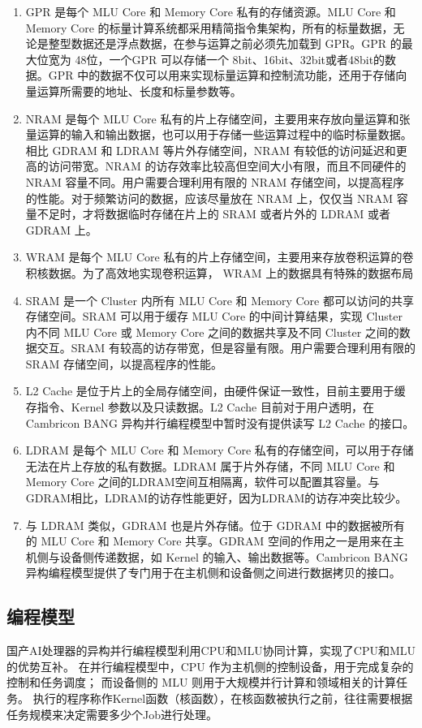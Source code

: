   \begin{enumerate}
  \item GPR 是每个 MLU Core 和 Memory Core 私有的存储资源。MLU Core 和 Memory Core 的标量计算系统都采用精简指令集架构，所有的标量数据，无论是整型数据还是浮点数据，在参与运算之前必须先加载到 GPR。GPR 的最大位宽为 48位，一个GPR 可以存储一个 8bit、16bit、32bit或者48bit的数据。GPR 中的数据不仅可以用来实现标量运算和控制流功能，还用于存储向量运算所需要的地址、长度和标量参数等。
  \item NRAM 是每个 MLU Core 私有的片上存储空间，主要用来存放向量运算和张量运算的输入和输出数据，也可以用于存储一些运算过程中的临时标量数据。相比 GDRAM 和 LDRAM 等片外存储空间，NRAM 有较低的访问延迟和更高的访问带宽。NRAM 的访存效率比较高但空间大小有限，而且不同硬件的 NRAM 容量不同。用户需要合理利用有限的 NRAM 存储空间，以提高程序的性能。对于频繁访问的数据，应该尽量放在 NRAM 上，仅仅当 NRAM 容量不足时，才将数据临时存储在片上的 SRAM 或者片外的 LDRAM 或者 GDRAM 上。
  \item WRAM 是每个 MLU Core 私有的片上存储空间，主要用来存放卷积运算的卷积核数据。为了高效地实现卷积运算，
  WRAM 上的数据具有特殊的数据布局
  \item SRAM 是一个 Cluster 内所有 MLU Core 和 Memory Core 都可以访问的共享存储空间。SRAM 可以用于缓存 MLU Core 的中间计算结果，实现 Cluster 内不同 MLU Core 或 Memory Core 之间的数据共享及不同 Cluster 之间的数据交互。SRAM 有较高的访存带宽，但是容量有限。用户需要合理利用有限的 SRAM 存储空间，以提高程序的性能。
  \item L2 Cache 是位于片上的全局存储空间，由硬件保证一致性，目前主要用于缓存指令、Kernel 参数以及只读数据。L2 Cache 目前对于用户透明，在 Cambricon BANG 异构并行编程模型中暂时没有提供读写 L2 Cache 的接口。
  \item LDRAM 是每个 MLU Core 和 Memory Core 私有的存储空间，可以用于存储无法在片上存放的私有数据。LDRAM 属于片外存储，不同 MLU Core 和 Memory Core 之间的LDRAM空间互相隔离，软件可以配置其容量。与GDRAM相比，LDRAM的访存性能更好，因为LDRAM的访存冲突比较少。
  \item 与 LDRAM 类似，GDRAM 也是片外存储。位于 GDRAM 中的数据被所有的 MLU Core 和 Memory Core 共享。GDRAM 空间的作用之一是用来在主机侧与设备侧传递数据，如 Kernel 的输入、输出数据等。Cambricon BANG 异构编程模型提供了专门用于在主机侧和设备侧之间进行数据拷贝的接口。
\end{enumerate}
\subsection{编程模型}
国产AI处理器的异构并行编程模型利用CPU和MLU协同计算，实现了CPU和MLU的优势互补。
在并行编程模型中，CPU 作为主机侧的控制设备，用于完成复杂的控制和任务调度；
而设备侧的 MLU 则用于大规模并行计算和领域相关的计算任务。
执行的程序称作Kernel函数（核函数），在核函数被执行之前，往往需要根据任务规模来决定需要多少个Job进行处理。

